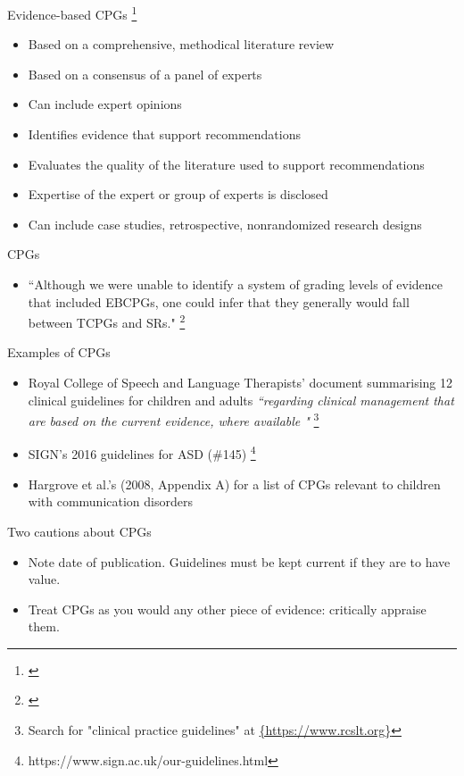 \documentclass{beamer}
\begin{document}
% 
\begin{frame}{Evidence-based CPGs \footnote{\tiny{\citet[Table 1]{Hargrove2008}}}}
	\begin{itemize}
	\item Based on a comprehensive, methodical literature review
	\item Based on a consensus of a panel of experts
	\item Can include expert opinions
	\item Identifies evidence that support recommendations
	\item Evaluates the quality of the literature used to support recommendations
	\item Expertise of the expert or group of experts is disclosed
	\item Can include case studies, retrospective, nonrandomized research designs
	\end{itemize}
\end{frame}

% 
\begin{frame}{CPGs}
	\begin{itemize}
	\item ``Although we were unable to identify a system of grading levels of evidence that included EBCPGs, one could infer that they generally would fall between TCPGs and SRs." \footnote{\tiny{\citet[p. 290]{Hargrove2008}}}
	\end{itemize}
\end{frame}

% 
\begin{frame}{Examples of CPGs}
	\begin{itemize}
	\item Royal College of Speech and Language Therapists' document \citep{Taylor-Goh2005} summarising 12 clinical guidelines for children and adults \emph{``regarding clinical management that are based on the current evidence, where available " } \footnote{\tiny{Search for "clinical practice guidelines" at \url{{https://www.rcslt.org}}}}
	\item SIGN's 2016 guidelines for ASD (\#145) \footnote{\tiny{https://www.sign.ac.uk/our-guidelines.html}}
	\item Hargrove et al.'s (2008, Appendix A) for a list of CPGs relevant to children with communication disorders
	\end{itemize}
\end{frame}

%
\begin{frame}{Two cautions about CPGs}
	\begin{itemize}
	\item Note date of publication. Guidelines must be kept current if they are to have value.
	\item Treat CPGs as you would any other piece of evidence: \alert{critically appraise them}.
	\end{itemize}
\end{frame}
\end{document}

